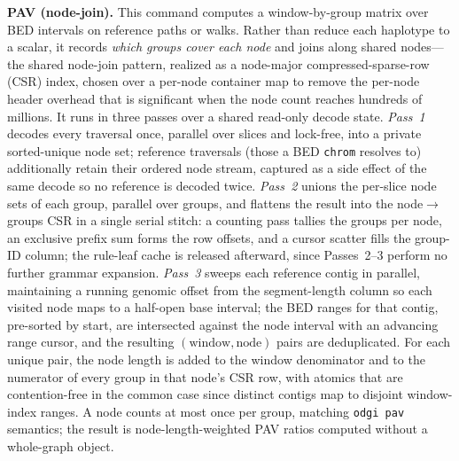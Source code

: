 \noindent\textbf{PAV (node-join).}
This command computes a window-by-group matrix over BED intervals on reference paths
or walks. Rather than reduce each haplotype to a scalar, it records \emph{which
groups cover each node} and joins along shared nodes---the shared node-join pattern,
realized as a node-major compressed-sparse-row (CSR) index, chosen over a per-node
container map to remove the per-node header overhead that is significant when the
node count reaches hundreds of millions. It runs in three passes over a shared
read-only decode state. \emph{Pass~1} decodes every traversal once, parallel over
slices and lock-free, into a private sorted-unique node set; reference traversals
(those a BED \texttt{chrom} resolves to) additionally retain their ordered node
stream, captured as a side effect of the same decode so no reference is decoded
twice. \emph{Pass~2} unions the per-slice node sets of each group, parallel over
groups, and flattens the result into the node$\rightarrow$groups CSR in a single
serial stitch: a counting pass tallies the groups per node, an exclusive prefix sum
forms the row offsets, and a cursor scatter fills the group-ID column; the rule-leaf
cache is released afterward, since Passes~2--3 perform no further grammar expansion.
\emph{Pass~3} sweeps each reference contig in parallel, maintaining a running genomic
offset from the segment-length column so each visited node maps to a half-open base
interval; the BED ranges for that contig, pre-sorted by start, are intersected
against the node interval with an advancing range cursor, and the resulting
$(\text{window},\text{node})$ pairs are deduplicated. For each unique pair, the node
length is added to the window denominator and to the numerator of every group in
that node's CSR row, with atomics that are contention-free in the common case since
distinct contigs map to disjoint window-index ranges. A node counts at most once per
group, matching \texttt{odgi pav} semantics; the result is node-length-weighted PAV
ratios computed without a whole-graph object.

